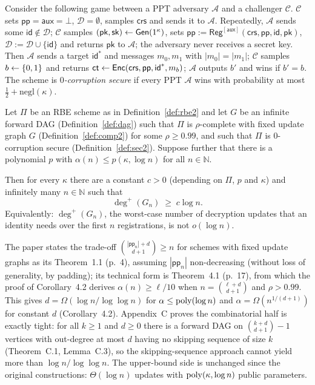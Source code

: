 \documentclass{aicr-conjecture}
\newcommand{\Gen}{\mathsf{Gen}}
\newcommand{\Reg}{\mathsf{Reg}}
\newcommand{\Enc}{\mathsf{Enc}}
\newcommand{\pp}{\mathsf{pp}}
\newcommand{\aux}{\mathsf{aux}}
\newcommand{\crs}{\mathsf{crs}}
\newcommand{\pk}{\mathsf{pk}}
\newcommand{\sk}{\mathsf{sk}}
\newcommand{\id}{\mathsf{id}}
\newcommand{\ct}{\mathsf{ct}}
\newcommand{\negl}{\mathrm{negl}}
\newcommand{\Nat}{\mathbb{N}}
\newcommand{\outdeg}{\deg^{+}}
\begin{document}
\begin{definition}\label{def:sec2}
Consider the following game between a PPT adversary $\mathcal{A}$ and a
challenger $\mathcal{C}$. $\mathcal{C}$ sets $\pp = \aux = \bot$,
$\mathcal{D} = \emptyset$, samples $\crs$ and sends it to $\mathcal{A}$.
Repeatedly, $\mathcal{A}$ sends some $\id \notin \mathcal{D}$;
$\mathcal{C}$ samples $(\pk,\sk) \sample \Gen(1^{\kappa})$, sets
$\pp := \Reg^{[\aux]}(\crs,\pp,\id,\pk)$,
$\mathcal{D} := \mathcal{D}\cup\{\id\}$ and returns $\pk$ to
$\mathcal{A}$; the adversary never receives a secret key. Then
$\mathcal{A}$ sends a target $\id^{*}$ and messages $m_0,m_1$ with
$|m_0| = |m_1|$; $\mathcal{C}$ samples $b \leftarrow \{0,1\}$ and returns
$\ct \sample \Enc(\crs,\pp,\id^{*},m_b)$; $\mathcal{A}$ outputs $b'$ and
wins if $b' = b$. The scheme is \emph{$0$-corruption secure} if every
PPT $\mathcal{A}$ wins with probability at most
$\tfrac12 + \negl(\kappa)$.
\end{definition}

\begin{conjecture}\label{conj:main}
Let $\Pi$ be an RBE scheme as in Definition~\ref{def:rbe2} and let $G$
be an infinite forward DAG (Definition~\ref{def:dag}) such that $\Pi$ is
$\rho$-complete with fixed update graph $G$
(Definition~\ref{def:comp2}) for some $\rho \ge 0.99$, and such that
$\Pi$ is $0$-corruption secure (Definition~\ref{def:sec2}). Suppose
further that there is a polynomial $p$ with
$\alpha(n) \le p(\kappa,\log n)$ for all $n \in \Nat$.

Then for every $\kappa$ there are a constant $c > 0$ (depending on
$\Pi$, $p$ and $\kappa$) and infinitely many $n \in \Nat$ such that
\[
  \outdeg(G_n) \;\ge\; c \log n .
\]
Equivalently: $\outdeg(G_n)$, the worst-case number of decryption
updates that an identity needs over the first $n$ registrations, is not
$o(\log n)$.
\end{conjecture}

\begin{remark}\label{rem:progress}
The paper states the trade-off
$\binom{|\pp_n|+d}{d+1} \ge n$ for schemes with fixed update graphs as
its Theorem~1.1 (p.~4), assuming $|\pp_n|$ non-decreasing (without loss
of generality, by padding); its technical form is Theorem~4.1 (p.~17),
from which the proof of Corollary~4.2 derives $\alpha(n) \ge \ell/10$
when $n = \binom{\ell+d}{d+1}$ and $\rho > 0.99$. This gives
$d = \Omega(\log n/\log\log n)$ for $\alpha \le \mathrm{poly}(\log n)$ and
$\alpha = \Omega(n^{1/(d+1)})$ for constant $d$ (Corollary~4.2).
Appendix~C proves the combinatorial half is exactly tight: for all
$k \ge 1$ and $d \ge 0$ there is a forward DAG on
$\binom{k+d}{d+1} - 1$ vertices with out-degree at most $d$ having no
skipping sequence of size $k$ (Theorem~C.1, Lemma~C.3), so the
skipping-sequence approach cannot yield more than
$\log n/\log\log n$. The upper-bound side is unchanged since the
original constructions: $\Theta(\log n)$ updates with
$\mathrm{poly}(\kappa,\log n)$ public parameters.
\end{remark}
\end{document}
